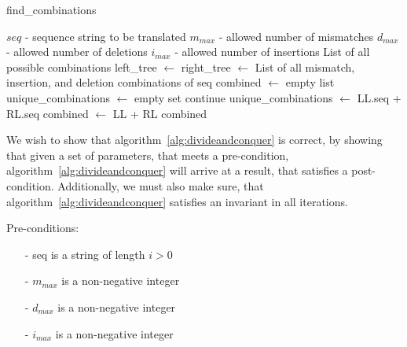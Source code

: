 \documentclass[12pt]{article}
\theoremstyle{definition}
\newcounter{subsubsubsection}[subsubsection]
\newcommand*\Let[2]{\State #1 $\gets$ #2}
\newcommand*\Returns[1]{\State \Return #1}
\begin{document}
\begin{spacing}{0.8}
\begin{algorithm}[H]
	\caption{find\_combinations}
	\label{alg:divideandconquer}
  	\begin{algorithmic}[1]
    		\Require
    			\Statex $seq$ - sequence string to be translated
    			\Statex $m_{max}$ - allowed number of mismatches
    			\Statex $d_{max}$ - allowed number of deletions
    			\Statex $i_{max}$ - allowed number of insertions
    		\Ensure
    			\Statex List of all possible combinations
		\Statex
    			\Let{left\_tree}{} \label{alg:divide:leftT}
    			\Let{right\_tree}{} \label{alg:divide:rightT}
    		\Else
    			\Returns{List of all mismatch, insertion, and deletion combinations of seq} \label{alg:divide:conquer}
    		\EndIf
    		\State
    		\Let{combined}{empty list}
    		\Let{unique\_combinations}{empty set}
    		 
    			 \label{alg:divide:inner} 
    				 \label{alg:divide:invariant1}
    					\State continue
    				\EndIf
    				 \label{alg:divide:invariant2}
    					\Let{unique\_combinations}{LL.seq + RL.seq}
    					\Let{combined}{LL + RL}
    				\EndIf
    			\EndFor
    		\EndFor
    		\Returns{combined}
    		\EndFunction
  	\end{algorithmic}
\end{algorithm}
\end{spacing}



We wish to show that algorithm~\ref{alg:divideandconquer} is correct, by showing that given a set of parameters, that meets a pre-condition, algorithm~\ref{alg:divideandconquer} will arrive at a result, that satisfies a post-condition. Additionally, we must also make sure, that algorithm~\ref{alg:divideandconquer} satisfies an invariant in all iterations.

Pre-conditions:
\begin{itemize}
\item[-] seq is a string of length $i > 0$
\item[-] $m_{max}$ is a non-negative integer
\item[-] $d_{max}$ is a non-negative integer
\item[-] $i_{max}$ is a non-negative integer
\end{itemize}
\end{document}
